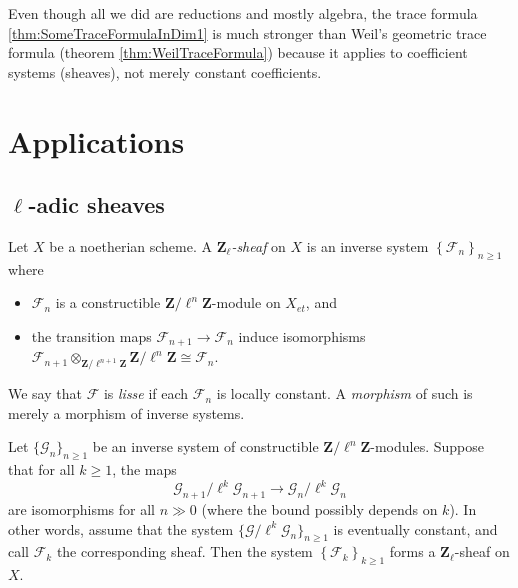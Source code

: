 \begin{remark}
Even though all we did are reductions and mostly algebra, the trace formula \ref{thm:SomeTraceFormulaInDim1} is much stronger than Weil's geometric trace formula (theorem \ref{thm:WeilTraceFormula}) because it applies to coefficient systems (sheaves), not merely constant coefficients. 
\end{remark}

\section{Applications}


\subsection{$\ell$-adic sheaves}

\begin{definition}
Let $X$ be a noetherian scheme. A \emph{$\mathbf{Z}_\ell$-sheaf} on $X$ is an inverse system $\left\{\mathcal{F}_n\right\}_{n\geq 1}$ where
\begin{itemize}
\item 
$\mathcal{F}_n$ is a constructible $\mathbf{Z}/\ell^n\mathbf{Z}$-module on $X_{et}$, and
\item 
the transition maps $\mathcal{F}_{n+1}\to \mathcal{F}_n$ induce isomorphisms $\mathcal{F}_{n+1}\otimes_{\mathbf{Z}/\ell^{n+1}\mathbf{Z}} \mathbf{Z}/\ell^n\mathbf{Z} \cong \mathcal{F}_n$.
\end{itemize}
We say that $\mathcal{F}$ is \emph{lisse} if each $\mathcal{F}_n$ is locally constant. A \emph{morphism} of such is merely a morphism of inverse systems.
\end{definition}

\begin{lemma} \label{lem:EventuallyCstInverseSystems}
Let $\{\mathcal{G}_n\}_{n\geq 1}$ be an inverse system of constructible $\mathbf{Z}/\ell^n\mathbf{Z}$-modules. Suppose that for all $k\geq 1$, the maps
$$
\mathcal{G}_{n+1}/\ell^k \mathcal{G}_{n+1}\to \mathcal{G}_n /\ell^k \mathcal{G}_n
$$
are isomorphisms for all $n\gg 0$ (where the bound possibly depends on $k$). In other words, assume that the system $\{\mathcal{G}/\ell^k\mathcal{G}_n\}_{n\geq 1}$ is eventually constant, and call $\mathcal{F}_k$ the corresponding sheaf. Then the system $\left\{\mathcal{F}_k\right\}_{k\geq 1}$ forms a $\mathbf{Z}_\ell$-sheaf on $X$.
\end{lemma}

